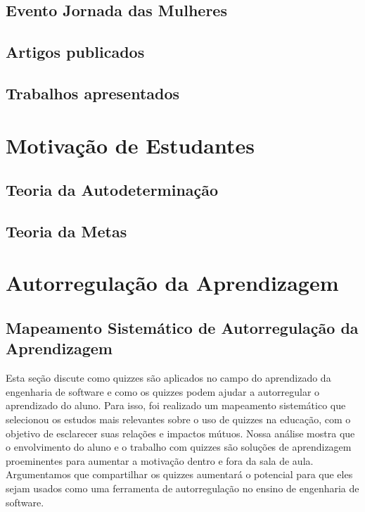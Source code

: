 \subsection{Evento Jornada das Mulheres}

\subsection{Artigos publicados}

\subsection{Trabalhos apresentados}


\section{Motivação de Estudantes}

\subsection{Teoria da Autodeterminação}

\subsection{Teoria da Metas}

\section{Autorregulação da Aprendizagem}

\subsection{Mapeamento Sistemático de Autorregulação da Aprendizagem}

Esta seção discute como quizzes são aplicados no campo do aprendizado da engenharia de software e como os quizzes podem ajudar a autorregular o aprendizado do aluno. Para isso, foi realizado um mapeamento sistemático que selecionou os estudos mais relevantes sobre o uso de quizzes na educação, com o objetivo de esclarecer suas relações e impactos mútuos. Nossa análise mostra que o envolvimento do aluno e o trabalho com quizzes são soluções de aprendizagem proeminentes para aumentar a motivação dentro e fora da sala de aula. Argumentamos que compartilhar os quizzes aumentará o potencial para que eles sejam usados como uma ferramenta de autorregulação no ensino de engenharia de software. 

